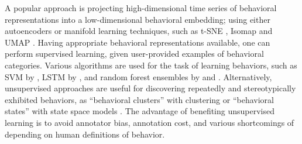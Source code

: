 A popular approach is projecting high-dimensional time series of behavioral representations into a low-dimensional behavioral embedding; using either autoencoders \citep{whiteway_partitioning_2021, graving_vae-sne_2020} or manifold learning techniques, such as t-SNE \citep{maaten_visualizing_2008}, Isomap \citep{tenenbaum_global_2000} and UMAP \citep{mcinnes_umap_2020} \citep{berman_mapping_2014, marshall_continuous_2021, hsu_b-soid_2021, deangelis_manifold_2019, mearns_deconstructing_2020}.
Having appropriate behavioral representations available, one can perform supervised learning, given user-provided examples of behavioral categories.
Various algorithms are used for the task of learning behaviors, such as SVM \citet{boser_training_1992} by \citet{hsu_b-soid_2021}, LSTM \citep{hochreiter_long_1997} by \citet{wu_neural_2021}, and random forest ensembles \citep{breiman_random_2001} by \citet{kabra_jaaba_2013} and \citet{nilsson_simple_2020}.
Alternatively, unsupervised approaches are useful for discovering repeatedly and stereotypically exhibited behaviors, as ``behavioral clusters'' with clustering \citep{berman_mapping_2014, todd_systematic_2017, marques_structure_2018, marshall_continuous_2021} or ``behavioral states'' with state space models \citep{wiltschko_mapping_2015}.
The advantage of benefiting unsupervised learning is to avoid annotator bias, annotation cost, and various shortcomings of depending on human definitions of behavior.

